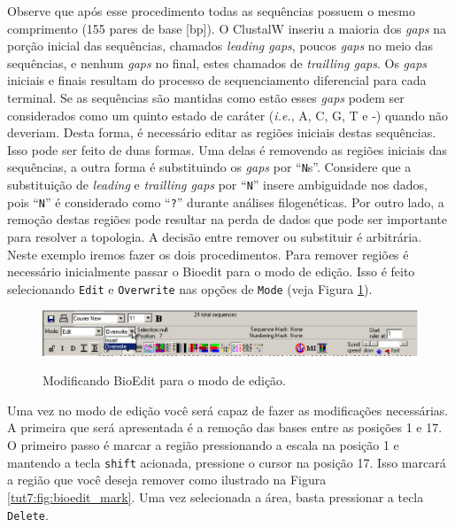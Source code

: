 \begin{refsection}
Observe que após esse procedimento todas as sequências possuem o mesmo comprimento (155 pares de base [bp]). O ClustalW inseriu a maioria dos \textit{gaps} na porção inicial das sequências, chamados \textit{leading gaps}, poucos \textit{gaps} no meio das sequências, e nenhum \textit{gaps} no final, estes chamados de \textit{trailling gaps}. Os \textit{gaps} iniciais e finais resultam do processo de sequenciamento diferencial para cada terminal. Se as sequências são mantidas como estão esses \textit{gaps} podem ser considerados como um quinto estado de caráter (\textit{i.e.}, A, C, G, T e -) quando não deveriam. Desta forma, é necessário editar as regiões iniciais destas sequências. Isso pode ser feito de duas formas. Uma delas é removendo as regiões iniciais das sequências, a outra forma é substituindo os \textit{gaps} por ``\texttt{N}s''. Considere que a substituição de \textit{leading} e \textit{trailling gaps} por ``\texttt{N}'' insere ambiguidade nos dados, pois ``\texttt{N}'' é considerado como ``\texttt{?}'' durante análises filogenéticas. Por outro lado, a remoção destas regiões pode resultar na perda de dados que pode ser importante para resolver a topologia. A decisão entre remover ou substituir é arbitrária.\\
Neste exemplo iremos fazer os dois procedimentos. Para remover regiões é necessário inicialmente passar o Bioedit para o modo de edição. Isso é feito selecionando \texttt{Edit} e \texttt{Overwrite} nas opções de \texttt{Mode} (veja Figura \ref{tut7:fig:bioedit_mode}).

  \begin{figure}[H]
      {\includegraphics[scale=0.5]{figures/tut7/bioedit_mode.eps}}
	{\caption[Bioedit: modo de edição]{Modificando BioEdit para o modo de edição.}\label{tut7:fig:bioedit_mode}}
  \end{figure}


Uma vez no modo de edição você será capaz de fazer as modificações necessárias. A primeira que será apresentada é a remoção das bases entre as posições 1 e 17. O primeiro passo é marcar a região pressionando a escala na posição 1 e mantendo a tecla \texttt{shift} acionada, pressione o cursor na posição 17. Isso marcará a região que você deseja remover como ilustrado na Figura \ref{tut7:fig:bioedit_mark}. Uma vez selecionada a área, basta pressionar a tecla \texttt{Delete}.


\end{refsection}
